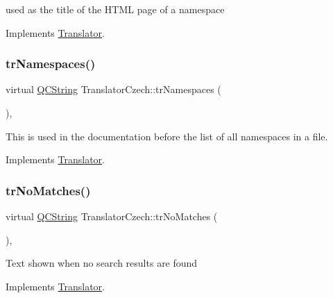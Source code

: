 used as the title of the H\+T\+ML page of a namespace 

Implements \mbox{\hyperlink{class_translator}{Translator}}.

\mbox{\label{class_translator_czech_ad9479ea66626a1742febf18f2be4776c}} 
\subsubsection{\texorpdfstring{trNamespaces()}{trNamespaces()}}
{\footnotesize\ttfamily virtual \mbox{\hyperlink{class_q_c_string}{Q\+C\+String}} Translator\+Czech\+::tr\+Namespaces (\begin{DoxyParamCaption}{ }\end{DoxyParamCaption})\hspace{0.3cm}{\ttfamily [inline]}, {\ttfamily [virtual]}}

This is used in the documentation before the list of all namespaces in a file. 

Implements \mbox{\hyperlink{class_translator}{Translator}}.

\mbox{\label{class_translator_czech_a06102d25b5bcefb28b5e0e67faa4b9a5}} 
\subsubsection{\texorpdfstring{trNoMatches()}{trNoMatches()}}
{\footnotesize\ttfamily virtual \mbox{\hyperlink{class_q_c_string}{Q\+C\+String}} Translator\+Czech\+::tr\+No\+Matches (\begin{DoxyParamCaption}{ }\end{DoxyParamCaption})\hspace{0.3cm}{\ttfamily [inline]}, {\ttfamily [virtual]}}

Text shown when no search results are found 

Implements \mbox{\hyperlink{class_translator}{Translator}}.

\mbox{\label{class_translator_czech_adfb2800acfda8d8c258efd75b5bc7721}} 

